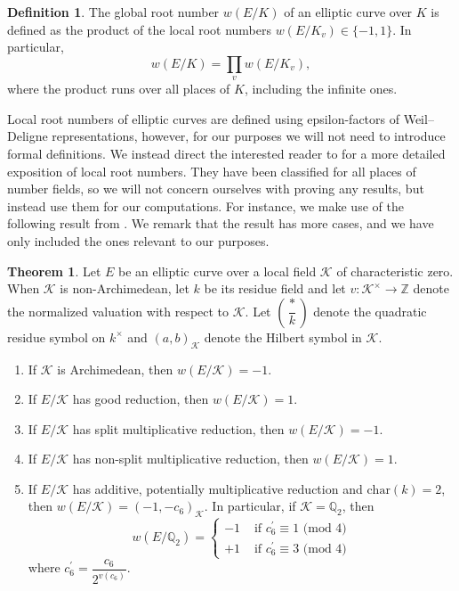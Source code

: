 \documentclass{article}
\newcommand{\Q}{\mathbb{Q}}
\newcommand{\Z}{\mathbb{Z}}
\theoremstyle{definition}
\newtheorem{theorem}{Theorem}[section]
\newtheorem{definition}{Definition}
\begin{document}
\begin{definition}
The global root number $w(E/K)$ of an elliptic curve over $K$ is defined as the product of the local root numbers $w(E/K_v) \in \{-1, 1\}$. In particular,
$$ w(E/K) = \prod_v w(E/K_v), $$
where the product runs over all places of $K$, including the infinite ones.
\end{definition}
\noindent Local root numbers of elliptic curves are defined using epsilon-factors of Weil--Deligne representations, however, for our purposes we will not need to introduce formal definitions. We instead direct the interested reader to \cite{rohrlich1993variation} for a more detailed exposition of local root numbers. They have been classified for all places of number fields, so we will not concern ourselves with proving any results, but instead use them for our computations. For instance, we make use of the following result from \cite{kellock2023rootnumbersparityphenomena}. We remark that the result has more cases, and we have only included the ones relevant to our purposes.
\begin{theorem}\label{kellockdokchitser}
Let $E$ be an elliptic curve over a local field $\mathcal{K}$ of characteristic zero. When $\mathcal{K}$ is non-Archimedean, let $k$ be its residue field and let $v \colon \mathcal{K}^{\times} \to \Z$ denote the normalized valuation with respect to $\mathcal{K}$. Let $\left( \dfrac{*}{k} \right)$ denote the quadratic residue symbol on $k^{\times}$ and $(a,b)_\mathcal{K}$ denote the Hilbert symbol in $\mathcal{K}$. 
\begin{enumerate}
    \item If $\mathcal{K}$ is Archimedean, then $w(E/\mathcal{K}) = -1$.
    \item If $E/\mathcal{K}$ has good reduction, then $w(E/\mathcal{K}) = 1$.
    \item If $E/\mathcal{K}$ has split multiplicative reduction, then $w(E/\mathcal{K}) = -1$.
    \item If $E/\mathcal{K}$ has non-split multiplicative reduction, then $w(E/\mathcal{K}) = 1$.
    \item If $E/\mathcal{K}$ has additive, potentially multiplicative reduction and $\text{char}(k) = 2$, then $w(E/\mathcal{K}) = (-1,-c_6)_\mathcal{K}$. In particular, if $\mathcal{K} = \Q_2$, then
    \begin{equation*}
        w(E/\Q_2) = \begin{cases}
            -1 & \text{ if } c_6^{'} \equiv 1 \text{ (mod } 4) \\
            +1 & \text{ if } c_6^{'} \equiv 3 \text{ (mod } 4) 
            \end{cases}
    \end{equation*}
    where $c_6^{'} = \dfrac{c_6}{2^{v(c_6)}}$.
\end{enumerate}
\end{theorem}
\end{document}
